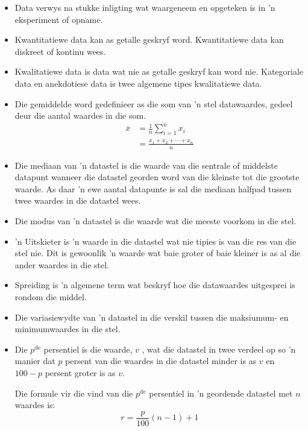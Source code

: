 \begin{itemize}[itemsep=6pt]
\item Data verwys na stukke inligting wat waargeneem en opgeteken is in ’n eksperiment of
opname. 

\item Kwantitatiewe data kan as getalle geskryf word. Kwantitatiewe data kan diskreet of kontinu wees.

\item Kwalitatiewe data is data wat nie as getalle geskryf kan word nie. Kategoriale data en anekdotiese data is twee algemene tipes kwalitatiewe data.

\item Die gemiddelde word gedefinieer as die som van ’n stel datawaardes, gedeel deur
die aantal waardes in die som. 
  \begin{align*}
    \overline{x} &= \frac{1}{n}\sum_{i=1}^n x_i \\
                 &= \frac{x_1 + x_2 + \cdots + x_n}{n}
  \end{align*}

\item Die mediaan van ’n datastel is die waarde van die sentrale of middelste datapunt
wanneer die datastel georden word van die kleinste tot die grootste waarde. As daar ’n ewe aantal datapunte is sal die mediaan halfpad tussen twee waardes in die datastel wees.
 

\item Die modus van ’n datastel is die waarde wat die meeste voorkom in die stel. 

\item ’n Uitskieter is ’n waarde in die datastel wat nie tipies is van die res van die stel
nie. Dit is gewoonlik ’n waarde wat baie groter of baie kleiner is as al die ander
waardes in die stel.

\item Spreiding is ’n algemene term wat beskryf hoe die datawaardes uitgesprei is rondom die middel.

\item Die variasiewydte van ’n datastel in die verskil tussen die maksiumum- en minimumwaardes in die stel. 

\item Die $p^{\mathrm{de}}$ persentiel is die waarde, $v$ , wat die datastel in twee verdeel op so ’n manier dat $p$ persent van die waardes in die datastel minder is as $v$ en $100 − p$ persent groter is as $v$.


Die formule vir die vind van die $p^{\mathrm{de}}$ persentiel in ’n geordende datastel met $n$ waardes is:
\begin{equation*}
  r = \frac{p}{100}\left(n-1\right)+1
\end{equation*}


\end{itemize}
